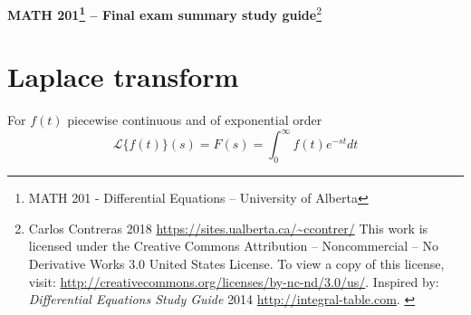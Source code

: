 \documentclass[10pt,leqno]{article}
\begin{document}
\pagestyle{empty}

\begin{center}
\begin{LARGE}\textbf{MATH 201\footnote{MATH 201 - Differential Equations -- University of Alberta} -- Final exam summary study guide}\footnote{Carlos Contreras {\scriptsize \textcopyleft \hspace{.5ex} 2018 \url{https://sites.ualberta.ca/~ccontrer/} This work is licensed under the Creative Commons Attribution --  Noncommercial -- No Derivative Works 3.0 United States License. To view a copy of this license, visit:  \url{http://creativecommons.org/licenses/by-nc-nd/3.0/us/}}. Inspired by: \textit{Differential Equations Study Guide} {\scriptsize \textcopyleft \hspace{.5ex} 2014 \hspace{.5ex} \url{http://integral-table.com}. }
 }\end{LARGE}

\section*{Laplace transform}

\begin{minipage}{4in}
For $f(t)$ piecewise continuous and of exponential order
\begin{equation}
\mathcal{L}\{f(t)\}(s)=F(s)=\int_{0}^{\infty}f(t)e^{-st} dt 
\end{equation}
\end{minipage}

\end{center}
\end{document}
